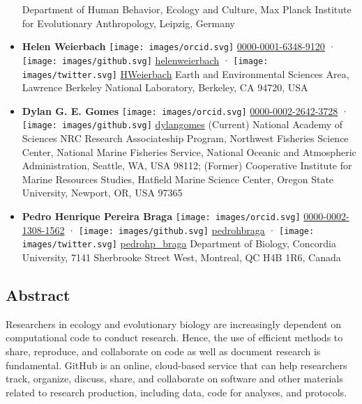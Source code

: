 \begin{itemize}
  Department of Human Behavior, Ecology and Culture, Max Planck Institute for Evolutionary Anthropology, Leipzig, Germany
\item
  \textbf{Helen Weierbach}
  \texttt{[image: images/orcid.svg]}
  \href{https://orcid.org/0000-0001-6348-9120}{0000-0001-6348-9120}
  · \texttt{[image: images/github.svg]}
  \href{https://github.com/helenweierbach}{helenweierbach}
  · \texttt{[image: images/twitter.svg]}
  \href{https://twitter.com/HWeierbach}{HWeierbach}
  Earth and Environmental Sciences Area, Lawrence Berkeley National Laboratory, Berkeley, CA 94720, USA
\item
  \textbf{Dylan G. E. Gomes}
  \texttt{[image: images/orcid.svg]}
  \href{https://orcid.org/0000-0002-2642-3728}{0000-0002-2642-3728}
  · \texttt{[image: images/github.svg]}
  \href{https://github.com/dylangomes}{dylangomes}
  (Current) National Academy of Sciences NRC Research Associateship Program, Northwest Fisheries Science Center, National Marine Fisheries Service, National Oceanic and Atmospheric Administration, Seattle, WA, USA 98112; (Former) Cooperative Institute for Marine Resources Studies, Hatfield Marine Science Center, Oregon State University, Newport, OR, USA 97365
\item
  \textbf{Pedro Henrique Pereira Braga}
  \texttt{[image: images/orcid.svg]}
  \href{https://orcid.org/0000-0002-1308-1562}{0000-0002-1308-1562}
  · \texttt{[image: images/github.svg]}
  \href{https://github.com/pedrohbraga}{pedrohbraga}
  · \texttt{[image: images/twitter.svg]}
  \href{https://twitter.com/pedrohp_braga}{pedrohp\_braga}
  Department of Biology, Concordia University, 7141 Sherbrooke Street West, Montreal, QC H4B 1R6, Canada
\end{itemize}

\hypertarget{abstract}{%
\subsection{Abstract}\label{abstract}}

Researchers in ecology and evolutionary biology are increasingly dependent on computational code to conduct research. Hence, the use of efficient methods to share, reproduce, and collaborate on code as well as document research is fundamental.
GitHub is an online, cloud-based service that can help researchers track, organize, discuss, share, and collaborate on software and other materials related to research production, including data, code for analyses, and protocols.

